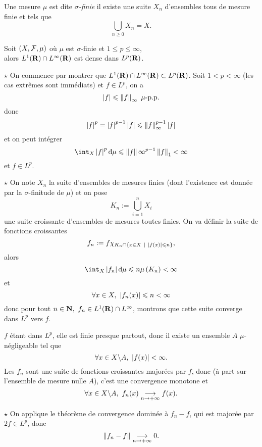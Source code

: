 \documentclass[a4paper,11pt, twoside]{article}
\begin{document}
\begin{Def}
  Une mesure $\mu$ est dite \emph{$\sigma$-finie} \ssi il existe une suite $X_n$ d'ensembles tous de mesure finie et tels que 
  $$\bigcup_{n\geqslant 0}X_n=X.$$
\end{Def}

\begin{Th}
  Soit $(X,\mathcal F,\mu)$ où $\mu$ est $\sigma$-finie et $1\leqslant p\leqslant \infty$,\\

  alors $L^1(\mathbf R)\cap L^\infty(\mathbf R)$ est dense dans $L^p(\mathbf R)$.
\end{Th}


\begin{Proof}
  $\star$ On commence par montrer que $L^1(\mathbf R)\cap L^\infty(\mathbf R)\subset L^p(\mathbf R)$. Soit $1<p<\infty$ (les cas extrêmes sont immédiats) et $f\in L^p$, on a 
  $$\abs f\leqslant \norm{f}_\infty\ \mu\text{-p.p.}$$
  donc 
  $$\left| f\right|^p=\left| f\right|^{p-1}\left| f\right|\leqslant \left\lVert f\right\rVert_\infty^{p-1}\left| f\right|$$
  et on peut intégrer
  $$\int_X \abs{f}^p\dmu\leqslant\norm{f}\infty^{p-1}\norm{f}_1<\infty$$
  et $f\in L^p$.

  $\star$ On note $X_n$ la suite d'ensembles de mesures finies (dont l'existence est donnée par la $\sigma$-finitude de $\mu$) et on pose 
  $$K_n:=\bigcup_{i=1}^n X_i$$
  une suite croissante d'ensembles de mesures toutes finies. On va définir la suite de fonctions croissantes 
  $$f_n:=f\chi_{K_n\cap\ens{x\in X\ |\ \abs{f(x)}\leqslant n}},$$
  alors 
  $$\int_X\abs{f_n}\dmu\leqslant n\mu\Par{K_n}<\infty$$
  et
  $$\forall x\in X,\ \left| f_n(x)\right|\leqslant n<\infty$$
  donc pour tout $n\in\mathbf N,\ f_n\in L^1(\mathbf R)\cap L^\infty$, montrons que cette suite converge dans $L^p$ vers $f$.

  $f$ étant dans $L^p$, elle est finie presque partout, donc il existe un ensemble $A$ $\mu$-négligeable tel que 
  $$\forall x\in X\backslash A,\ \abs{f(x)}<\infty.$$
  Les $f_n$ sont une suite de fonctions croissantes majorées par $f$, donc (à part sur l'ensemble de mesure nulle $A$), c'est une convergence monotone et 
  $$\forall x\in X\backslash A,\ f_n(x)\underset{n\to+\infty}{\longrightarrow} f(x).$$

  $\star$ On applique le théorème de convergence dominée à $f_n-f$, qui est majorée par $2f\in L^p$, donc 
  $$\left\lVert f_n-f\right\rVert\underset{n\to+\infty}{\longrightarrow} 0.$$
\end{Proof}




\end{document}
